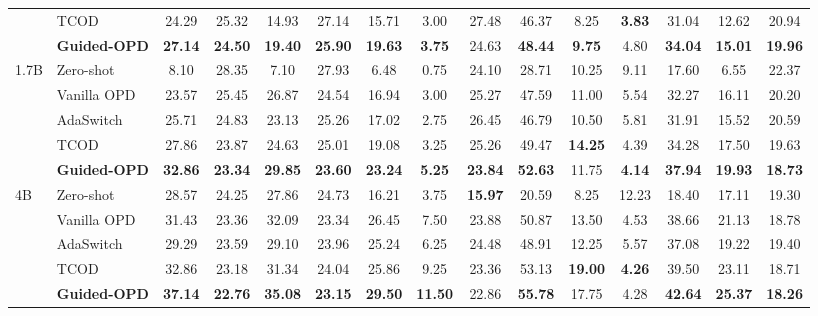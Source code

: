 \documentclass[11pt]{article}
\begin{document}
\begin{table}[t]
{\begin{tabular}{ll cccc ccc ccc ccc}
 & TCOD          & 24.29 & 25.32 & 14.93 & 27.14 & 15.71 & 3.00 & 27.48 & 46.37 & 8.25 & \textbf{3.83} & 31.04 & 12.62 & 20.94 \\
 & \textbf{Guided-OPD} & \textbf{27.14} & \textbf{24.50} & \textbf{19.40} & \textbf{25.90} & \textbf{19.63} & \textbf{3.75} & 24.63 & \textbf{48.44} & \textbf{9.75} & 4.80 & \textbf{34.04} & \textbf{15.01} & \textbf{19.96} \\
\midrule
\multirow{5}{*}{1.7B}
 & Zero-shot     &  8.10 & 28.35 &  7.10 & 27.93 &  6.48 & 0.75 & 24.10 & 28.71 & 10.25 &  9.11 & 17.60 &  6.55 & 22.37 \\
 & Vanilla OPD   & 23.57 & 25.45 & 26.87 & 24.54 & 16.94 & 3.00 & 25.27 & 47.59 & 11.00 &  5.54 & 32.27 & 16.11 & 20.20 \\
 & AdaSwitch     & 25.71 & 24.83 & 23.13 & 25.26 & 17.02 & 2.75 & 26.45 & 46.79 & 10.50 &  5.81 & 31.91 & 15.52 & 20.59 \\
 & TCOD          & 27.86 & 23.87 & 24.63 & 25.01 & 19.08 & 3.25 & 25.26 & 49.47 & \textbf{14.25} & 4.39 & 34.28 & 17.50 & 19.63 \\
 & \textbf{Guided-OPD} & \textbf{32.86} & \textbf{23.34} & \textbf{29.85} & \textbf{23.60} & \textbf{23.24} & \textbf{5.25} & \textbf{23.84} & \textbf{52.63} & 11.75 & \textbf{4.14} & \textbf{37.94} & \textbf{19.93} & \textbf{18.73} \\
\midrule
\multirow{5}{*}{4B}
 & Zero-shot     & 28.57 & 24.25 & 27.86 & 24.73 & 16.21 & 3.75 & \textbf{15.97} & 20.59 &  8.25 & 12.23 & 18.40 & 17.11 & 19.30 \\
 & Vanilla OPD   & 31.43 & 23.36 & 32.09 & 23.34 & 26.45 & 7.50 & 23.88 & 50.87 & 13.50 &  4.53 & 38.66 & 21.13 & 18.78 \\
 & AdaSwitch     & 29.29 & 23.59 & 29.10 & 23.96 & 25.24 & 6.25 & 24.48 & 48.91 & 12.25 &  5.57 & 37.08 & 19.22 & 19.40 \\
 & TCOD          & 32.86 & 23.18 & 31.34 & 24.04 & 25.86 & 9.25 & 23.36 & 53.13 & \textbf{19.00} & \textbf{4.26} & 39.50 & 23.11 & 18.71 \\
 & \textbf{Guided-OPD} & \textbf{37.14} & \textbf{22.76} & \textbf{35.08} & \textbf{23.15} & \textbf{29.50} & \textbf{11.50} & 22.86 & \textbf{55.78} & 17.75 & 4.28 & \textbf{42.64} & \textbf{25.37} & \textbf{18.26} \\
\bottomrule
\end{tabular}%
}
\end{table}
\end{document}

